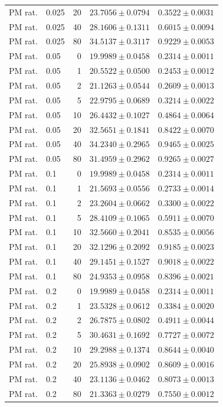 \begin{longtable}{llrll}
PM rat. & 0.025 & 20 & $23.7056 \pm 0.0794$ & $0.3522 \pm 0.0031$ \\
PM rat. & 0.025 & 40 & $28.1606 \pm 0.1311$ & $0.6015 \pm 0.0094$ \\
PM rat. & 0.025 & 80 & $34.5137 \pm 0.3117$ & $0.9229 \pm 0.0053$ \\
PM rat. & 0.05 & 0 & $19.9989 \pm 0.0458$ & $0.2314 \pm 0.0011$ \\
PM rat. & 0.05 & 1 & $20.5522 \pm 0.0500$ & $0.2453 \pm 0.0012$ \\
PM rat. & 0.05 & 2 & $21.1263 \pm 0.0544$ & $0.2609 \pm 0.0013$ \\
PM rat. & 0.05 & 5 & $22.9795 \pm 0.0689$ & $0.3214 \pm 0.0022$ \\
PM rat. & 0.05 & 10 & $26.4432 \pm 0.1027$ & $0.4864 \pm 0.0064$ \\
PM rat. & 0.05 & 20 & $32.5651 \pm 0.1841$ & $0.8422 \pm 0.0070$ \\
PM rat. & 0.05 & 40 & $34.2340 \pm 0.2965$ & $0.9465 \pm 0.0025$ \\
PM rat. & 0.05 & 80 & $31.4959 \pm 0.2962$ & $0.9265 \pm 0.0027$ \\
PM rat. & 0.1 & 0 & $19.9989 \pm 0.0458$ & $0.2314 \pm 0.0011$ \\
PM rat. & 0.1 & 1 & $21.5693 \pm 0.0556$ & $0.2733 \pm 0.0014$ \\
PM rat. & 0.1 & 2 & $23.2604 \pm 0.0662$ & $0.3300 \pm 0.0022$ \\
PM rat. & 0.1 & 5 & $28.4109 \pm 0.1065$ & $0.5911 \pm 0.0070$ \\
PM rat. & 0.1 & 10 & $32.5660 \pm 0.2041$ & $0.8535 \pm 0.0056$ \\
PM rat. & 0.1 & 20 & $32.1296 \pm 0.2092$ & $0.9185 \pm 0.0023$ \\
PM rat. & 0.1 & 40 & $29.1451 \pm 0.1527$ & $0.9018 \pm 0.0022$ \\
PM rat. & 0.1 & 80 & $24.9353 \pm 0.0958$ & $0.8396 \pm 0.0021$ \\
PM rat. & 0.2 & 0 & $19.9989 \pm 0.0458$ & $0.2314 \pm 0.0011$ \\
PM rat. & 0.2 & 1 & $23.5328 \pm 0.0612$ & $0.3384 \pm 0.0020$ \\
PM rat. & 0.2 & 2 & $26.7875 \pm 0.0802$ & $0.4911 \pm 0.0044$ \\
PM rat. & 0.2 & 5 & $30.4631 \pm 0.1692$ & $0.7727 \pm 0.0072$ \\
PM rat. & 0.2 & 10 & $29.2988 \pm 0.1374$ & $0.8644 \pm 0.0040$ \\
PM rat. & 0.2 & 20 & $25.8938 \pm 0.0902$ & $0.8609 \pm 0.0016$ \\
PM rat. & 0.2 & 40 & $23.1136 \pm 0.0462$ & $0.8073 \pm 0.0013$ \\
PM rat. & 0.2 & 80 & $21.3363 \pm 0.0279$ & $0.7550 \pm 0.0012$ \\
\end{longtable}

